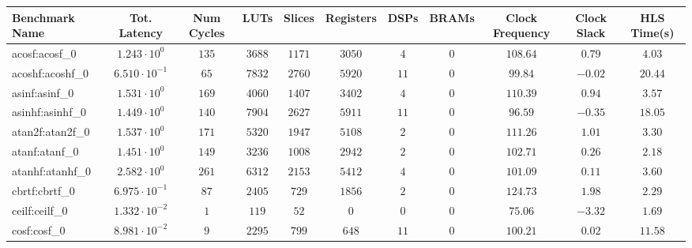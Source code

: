 \begin{tabular}{|l|c|c|c|c|c|c|c|c|c|c|}
\hline
Benchmark Name               & Tot. Latency            & Num Cycles & LUTs       & Slices    & Registers & DSPs    & BRAMs & Clock Frequency & Clock Slack & HLS Time(s) \\
\hline
acosf:acosf\_0               & $ 1.243 \cdot 10^{0}  $ & $ 135    $ & $ 3688   $ & $ 1171  $ & $ 3050  $ & $ 4   $ & $ 0 $ & $ 108.64      $ & $ 0.79    $ & $ 4.03    $ \\
acoshf:acoshf\_0             & $ 6.510 \cdot 10^{-1} $ & $ 65     $ & $ 7832   $ & $ 2760  $ & $ 5920  $ & $ 11  $ & $ 0 $ & $ 99.84       $ & $ -0.02   $ & $ 20.44   $ \\
asinf:asinf\_0               & $ 1.531 \cdot 10^{0}  $ & $ 169    $ & $ 4060   $ & $ 1407  $ & $ 3402  $ & $ 4   $ & $ 0 $ & $ 110.39      $ & $ 0.94    $ & $ 3.57    $ \\
asinhf:asinhf\_0             & $ 1.449 \cdot 10^{0}  $ & $ 140    $ & $ 7904   $ & $ 2627  $ & $ 5911  $ & $ 11  $ & $ 0 $ & $ 96.59       $ & $ -0.35   $ & $ 18.05   $ \\
atan2f:atan2f\_0             & $ 1.537 \cdot 10^{0}  $ & $ 171    $ & $ 5320   $ & $ 1947  $ & $ 5108  $ & $ 2   $ & $ 0 $ & $ 111.26      $ & $ 1.01    $ & $ 3.30    $ \\
atanf:atanf\_0               & $ 1.451 \cdot 10^{0}  $ & $ 149    $ & $ 3236   $ & $ 1008  $ & $ 2942  $ & $ 2   $ & $ 0 $ & $ 102.71      $ & $ 0.26    $ & $ 2.18    $ \\
atanhf:atanhf\_0             & $ 2.582 \cdot 10^{0}  $ & $ 261    $ & $ 6312   $ & $ 2153  $ & $ 5412  $ & $ 4   $ & $ 0 $ & $ 101.09      $ & $ 0.11    $ & $ 3.60    $ \\
cbrtf:cbrtf\_0               & $ 6.975 \cdot 10^{-1} $ & $ 87     $ & $ 2405   $ & $ 729   $ & $ 1856  $ & $ 2   $ & $ 0 $ & $ 124.73      $ & $ 1.98    $ & $ 2.29    $ \\
ceilf:ceilf\_0               & $ 1.332 \cdot 10^{-2} $ & $ 1      $ & $ 119    $ & $ 52    $ & $ 0     $ & $ 0   $ & $ 0 $ & $ 75.06       $ & $ -3.32   $ & $ 1.69    $ \\
cosf:cosf\_0                 & $ 8.981 \cdot 10^{-2} $ & $ 9      $ & $ 2295   $ & $ 799   $ & $ 648   $ & $ 11  $ & $ 0 $ & $ 100.21      $ & $ 0.02    $ & $ 11.58   $ \\

\end{tabular}
